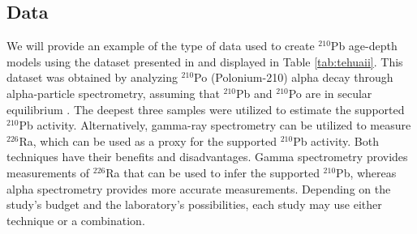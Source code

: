 \documentclass [10pt] {article}
\newcommand{\ac}{\color{red} }  %
\newcommand{\ca}{\color{black}} %
\begin{document}
\subsection{Data}

We will provide an example of the type of data used to create $^{210}$Pb age-depth models using the dataset presented in \citet{Sanchez-Cabeza2012} and displayed in Table \ref{tab:tehuaii}. This dataset was obtained by analyzing $^{210}$Po (Polonium-210) alpha decay  through alpha-particle spectrometry, assuming that $^{210}$Pb and $^{210}$Po are in secular equilibrium \citep[see][for details]{Sanchez-Cabeza2012}. The deepest three samples were utilized to estimate the supported $^{210}$Pb activity. Alternatively, gamma-ray spectrometry can be utilized to measure $^{226}$Ra, which can be used as a proxy for the supported $^{210}$Pb activity. Both techniques have their benefits and disadvantages. Gamma spectrometry provides measurements of $^{226}$Ra that can be used to infer the supported $^{210}$Pb, whereas alpha spectrometry provides more accurate measurements. Depending on the study's budget and the laboratory's possibilities, each study may use either technique or a combination.

\end{document}
